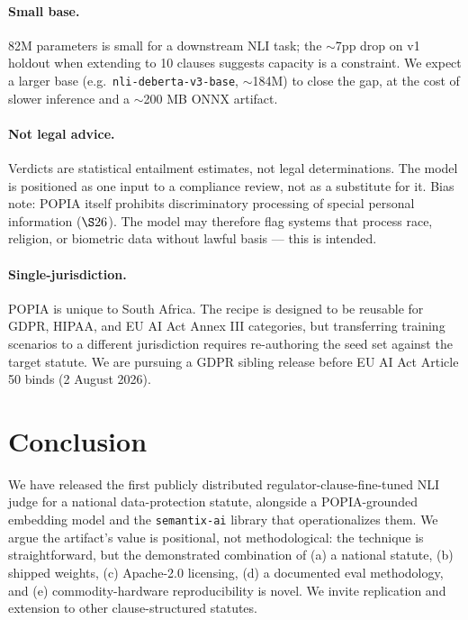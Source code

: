 \documentclass[11pt]{article}
\begin{document}
\paragraph{Small base.} 82M parameters is small for a downstream NLI task; the $\sim$7pp drop on v1 holdout when extending to 10 clauses suggests capacity is a constraint. We expect a larger base (e.g.\ \texttt{nli-deberta-v3-base}, $\sim$184M) to close the gap, at the cost of slower inference and a $\sim$200 MB ONNX artifact.

\paragraph{Not legal advice.} Verdicts are statistical entailment estimates, not legal determinations. The model is positioned as one input to a compliance review, not as a substitute for it. Bias note: POPIA itself prohibits discriminatory processing of special personal information ($\S 26$). The model may therefore flag systems that process race, religion, or biometric data without lawful basis --- this is intended.

\paragraph{Single-jurisdiction.} POPIA is unique to South Africa. The recipe is designed to be reusable for GDPR, HIPAA, and EU AI Act Annex III categories, but transferring training scenarios to a different jurisdiction requires re-authoring the seed set against the target statute. We are pursuing a GDPR sibling release before EU AI Act Article 50 binds (2 August 2026).

\section{Conclusion}
We have released the first publicly distributed regulator-clause-fine-tuned NLI judge for a national data-protection statute, alongside a POPIA-grounded embedding model and the \texttt{semantix-ai} library that operationalizes them. We argue the artifact's value is positional, not methodological: the technique is straightforward, but the demonstrated combination of (a) a national statute, (b) shipped weights, (c) Apache-2.0 licensing, (d) a documented eval methodology, and (e) commodity-hardware reproducibility is novel. We invite replication and extension to other clause-structured statutes.



\end{document}
